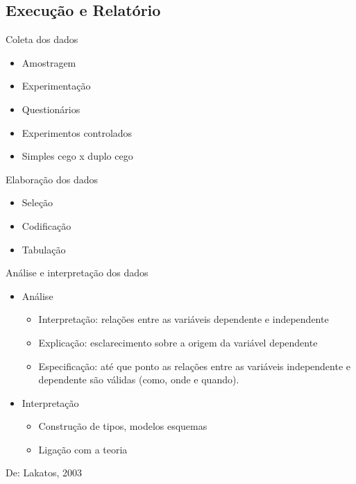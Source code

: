 \documentclass{beamer}
\begin{document}


\subsection{Execução e Relatório}

\begin{frame}{Coleta dos dados}
  \begin{itemize}
  \item Amostragem
  \item Experimentação
  \item Questionários
  \item Experimentos controlados
  \item Simples cego x duplo cego
  \end{itemize}
\end{frame}

\begin{frame}{Elaboração dos dados}
  \begin{itemize}
  \item Seleção
  \item Codificação
  \item Tabulação
  \end{itemize}
\end{frame}

\begin{frame}{Análise e interpretação dos dados}
  \begin{itemize}
  \item Análise
    \begin{itemize}
    \item Interpretação: relações entre as variáveis dependente e
      independente
    \item Explicação: esclarecimento sobre a origem da variável
      dependente
    \item Especificação: até que ponto as relações entre as variáveis
      independente e dependente são válidas (como, onde e quando).
    \end{itemize}
  \item Interpretação
    \begin{itemize}
    \item Construção de tipos, modelos esquemas
    \item Ligação com a teoria
    \end{itemize}
  \end{itemize}
  De: Lakatos, 2003
\end{frame}
\end{document}
